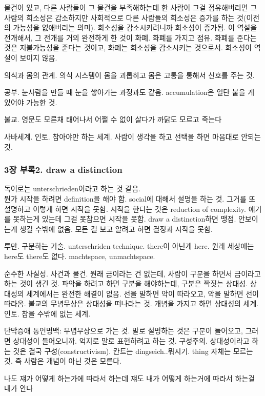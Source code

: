 \documentclass[11pt, a4paper]{article}
\begin{document}
물건이 있고, 다른 사람들이 그 물건을 부족해하는데 한 사람이 그걸 점유해버리면 그 사람의 희소성은 감소하지만 사회적으로 다른 사람들의 희소성은 증가를 하는 것(이전의 가능성을 없애버리는 의미). 희소성을 감소시키려니까 희소성이 증가됨. 이 역설을 전개해서, 그 전개를 거의 완전하게 한 것이 화폐. 화폐를 가지고 점유. 화폐를 준다는 것은 지불가능성을 준다는 것이고, 화폐는 희소성을 감소시키는 것으로서. 희소성이 역설이 보이지 않음.

의식과 몸의 관계. 의식 시스템이 몸을 괴롭히고 몸은 고통을 통해서 신호를 주는 것.

공부. 눈사람을 만들 때 눈을 쌓아가는 과정과도 같음. accumulation은 일단 붙을 게 있어야 가능한 것.

불교. 영문도 모른채 태어나서 어쩔 수 없이 살다가 까닭도 모르고 죽는다

사바세계. 인토. 참아야만 하는 세계. 사람이 생각을 하고 선택을 하면 마음대로 안되는 것. 

\subsubsection{3장 부록2. draw a distinction}
독어로는 unterschrieden이라고 하는 것 같음.\\
뭔가 시작을 하려면 definition을 해야 함. social에 대해서 설명을 하는 것. 그거를 또 설명하고 이렇게 하면 시작을 못함. 시작을 한다는 것은 reduction of complexity. 얘기를 못하는게 있는데 그걸 못참으면 시작을 못함. draw a distinction하면 맹점. 안보이는게 생길 수밖에 없음. 모든 걸 보고 알려고 하면 결정과 시작을 못함.

루만. 구분하는 기술. unterschriden technique. there이 아닌게 here. 원래 세상에는 here도 there도 없다. machtspace, unmachtspace. 

순수한 사실성. 사건과 물건. 원래 금이라는 건 없는데, 사람이 구분을 하면서 금이라고 하는 것이 생긴 것. 파악을 하려고 하면 구분을 해야하는데, 구분은 짝짓는 상대성. 상대성의 세계에서는 완전한 해결이 없음. 선을 말하면 악이 따라오고, 악을 말하면 선이 따라옴. 불교의 무념무상은 상대성을 떠나라는 것. 개념을 가지고 하면 상대성의 세계. 인토. 참을 수밖에 없는 세계.

단막증애 통연명백: 무념무상으로 가는 것. 말로 설명하는 것은 구분이 들어오고, 그러면 상대성이 들어오니까. 억지로 말로 표현하려고 하는 것. 구성주의. 상대성이라고 하는 것은 결국 구성(constructivism). 칸트는 dingseich..뭐시기. thing 자체는 모르는 것. 즉 사람은 개념이 아닌 것은 모른다.

나도 쟤가 어떻게 하는가에 따라서 하는데 쟤도 내가 어떻게 하는거에 따라서 하는걸 내가 안다
\end{document}
